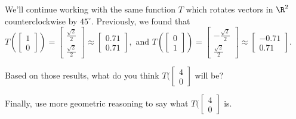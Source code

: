 We'll continue working with the same function $T$ which rotates vectors in $\R^2$ counterclockwise by $45^\circ$.  Previously, we found that $T(\left[\begin{array}{c}
1 \\
0 
\end{array} \right]) = \left[\begin{array}{c}
\frac{\sqrt{2}}{2} \\
\frac{\sqrt{2}}{2} 
\end{array} \right] \approx  \left[\begin{array}{c}
0.71 \\
0.71 
\end{array} \right]
,$ and 
$T(\left[\begin{array}{c}
0 \\
1 
\end{array} \right]) = \left[\begin{array}{c}
-\frac{\sqrt{2}}{2} \\
\frac{\sqrt{2}}{2} 
\end{array} \right] \approx  \left[\begin{array}{c}
-0.71 \\
0.71 
\end{array} \right]
 . $ 
 
Based on those results, what do you think $T(\left[\begin{array}{c}
4 \\
0 
\end{array} \right]$ will be?





\edXsolution{ 
}

\endedxproblem






Finally, use more geometric reasoning to say what $T(\left[\begin{array}{c}
4 \\
0 
\end{array} \right]$ is.  





\edXsolution{ 
}

\endedxproblem





\endedxvertical


